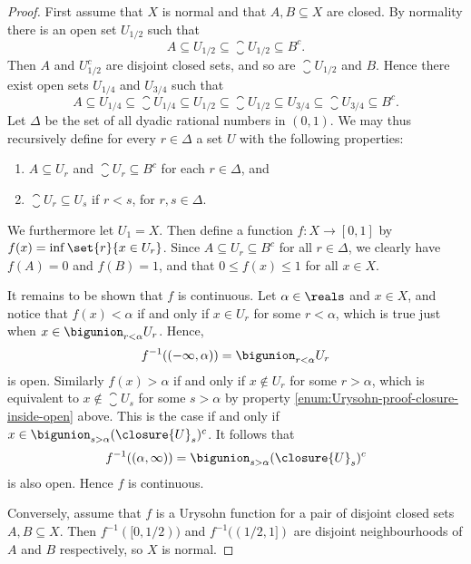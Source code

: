 \documentclass[article, a4paper, 11pt, oneside]{memoir}
\numberwithin{equation}{chapter}
\newcommand{\preim}{^{-1}}
\begin{document}
\begin{proof}
    First assume that $X$ is normal and that $A,B \subseteq X$ are closed. By normality there is an open set $U_{1/2}$ such that
    \begin{equation*}
        A
            \subseteq U_{1/2}
            \subseteq \closure{U}_{\!1/2}
            \subseteq B^c.
    \end{equation*}
    Then $A$ and $U_{1/2}^c$ are disjoint closed sets, and so are $\closure{U}_{\!1/2}$ and $B$. Hence there exist open sets $U_{1/4}$ and $U_{3/4}$ such that
    \begin{equation*}
        A
            \subseteq U_{1/4}
            \subseteq \closure{U}_{\!1/4}
            \subseteq U_{1/2}
            \subseteq \closure{U}_{\!1/2}
            \subseteq U_{3/4}
            \subseteq \closure{U}_{\!3/4}
            \subseteq B^c.
    \end{equation*}
    Let $\Delta$ be the set of all dyadic rational numbers in $(0,1)$. We may thus recursively define for every $r \in \Delta$ a set $U$ with the following properties:
    \begin{enumerate} %
        \item $A \subseteq U_r$ and $\closure{U}_r \subseteq B^c$ for each $r \in \Delta$, and

        \item \label{enum:Urysohn-proof-closure-inside-open} $\closure{U}_r \subseteq U_s$ if $r < s$, for $r,s \in \Delta$.
    \end{enumerate}
    We furthermore let $U_1 = X$. Then define a function $f \colon X \to [0,1]$ by $f(x) = \inf \set{r}{x \in U_r}$. Since $A \subseteq U_r \subseteq B^c$ for all $r \in \Delta$, we clearly have $f(A) = 0$ and $f(B) = 1$, and that $0 \leq f(x) \leq 1$ for all $x \in X$.

    It remains to be shown that $f$ is continuous. Let $\alpha \in \reals$ and $x \in X$, and notice that $f(x) < \alpha$ if and only if $x \in U_r$ for some $r < \alpha$, which is true just when $x \in \bigunion_{r < \alpha} U_r$. Hence,
    \begin{equation*}
        f\preim((-\infty,\alpha))
            = \bigunion_{r < \alpha} U_r
    \end{equation*}
    is open. Similarly $f(x) > \alpha$ if and only if $x \not\in U_r$ for some $r > \alpha$, which is equivalent to $x \not\in \closure{U}_s$ for some $s > \alpha$ by property \cref{enum:Urysohn-proof-closure-inside-open} above. This is the case if and only if $x \in \bigunion_{s > \alpha} (\closure{U}_s)^c$. It follows that
    \begin{equation*}
        f\preim((\alpha,\infty))
            = \bigunion_{s > \alpha} (\closure{U}_s)^c
    \end{equation*}
    is also open. Hence $f$ is continuous.

    Conversely, assume that $f$ is a Urysohn function for a pair of disjoint closed sets $A,B \subseteq X$. Then $f\preim([0,1/2))$ and $f\preim((1/2,1])$ are disjoint neighbourhoods of $A$ and $B$ respectively, so $X$ is normal.
\end{proof}
\end{document}
